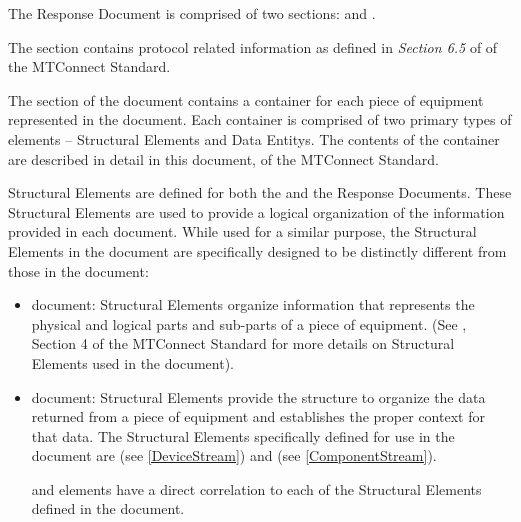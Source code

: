 The  \gls{Response Document} is comprised of two sections:  and .

The  section contains protocol related information as defined in \textit{Section 6.5} of  of the MTConnect Standard.

The  section of the  document contains a  container for each piece of equipment represented in the document.  Each  container is comprised of two primary types of elements – \glspl{Structural Element} and \glspl{Data Entity}.  The contents of the  container are described in detail in this document,  of the MTConnect Standard.

\glspl{Structural Element} are defined for both the  and the  \glspl{Response Document}.  These \glspl{Structural Element} are used to provide a logical organization of the information provided in each document.  While used for a similar purpose, the \glspl{Structural Element} in the  document are specifically designed to be distinctly different from those in the  document:  

\begin{itemize}

\item {} document: \glspl{Structural Element} organize information that represents the physical and logical parts and sub-parts of a piece of equipment.  (See , Section 4 of the MTConnect Standard for more details on \glspl{Structural Element} used in the  document).  

\item {} document: \glspl{Structural Element} provide the structure to organize the data returned from a piece of equipment and establishes the proper context for that data.  The \glspl{Structural Element} specifically defined for use in the  document are  (see \ref{DeviceStream}) and  (see \ref{ComponentStream}).   

 and  elements have a direct correlation to each of the \glspl{Structural Element} defined in the  document.
\end{itemize}

